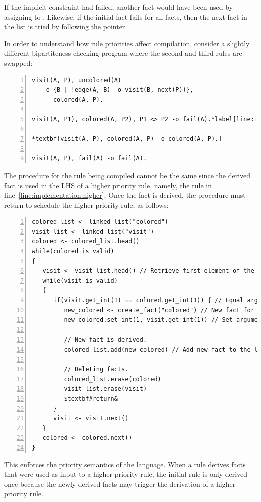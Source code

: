 If the implicit constraint had failed, another  fact would have been
used by assigning  to .  Likewise, if the initial
 fact fails for all  facts, then the next
 fact in the list is tried by following the  pointer.

In order to understand how rule priorities affect compilation, consider a
slightly different bipartiteness checking program where the second and third
rules are swapped:

\begin{Verbatim}[numbers=left,fontsize=\codesize,commandchars=\*\[\]]
visit(A, P), uncolored(A)
   -o {B | !edge(A, B) -o visit(B, next(P))},
      colored(A, P).

visit(A, P1), colored(A, P2), P1 <> P2 -o fail(A).*label[line:implementation:higher]

*textbf[visit(A, P), colored(A, P) -o colored(A, P).]

visit(A, P), fail(A) -o fail(A).
\end{Verbatim}

The procedure for the rule
being compiled cannot be the same since the derived  fact
is used in the LHS of a higher priority rule, namely, the rule in 
line~\ref{line:implementation:higher}. Once the  fact is derived,
the procedure must return to schedule the higher priority rule, as follows:

\begin{Verbatim}[numbers=left,fontsize=\codesize,commandchars=\$\#\&]
colored_list <- linked_list("colored")
visit_list <- linked_list("visit")
colored <- colored_list.head()
while(colored is valid)
{
   visit <- visit_list.head() // Retrieve first element of the list.
   while(visit is valid)
   {
      if(visit.get_int(1) == colored.get_int(1)) { // Equal arguments?
         new_colored <- create_fact("colored") // New fact for predicate colored.
         new_colored.set_int(1, visit.get_int(1)) // Set arguments.

         // New fact is derived.
         colored_list.add(new_colored) // Add new fact to the linked list.

         // Deleting facts.
         colored_list.erase(colored)
         visit_list.erase(visit)
         $textbf#return&
      }
      visit <- visit.next()
   }
   colored <- colored.next()
}
\end{Verbatim}

This enforces the priority semantics of the language. When a rule derives facts
that were used as input to a higher priority rule, the initial rule is only
derived once because the newly derived facts may trigger the derivation of a
higher priority rule.
    
